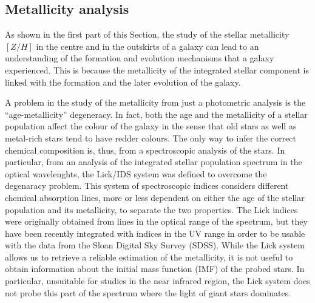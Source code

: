 			
\subsection{Metallicity analysis}	\label{sec:metAn}
	As shown in the first part of this Section, %
	the study of the stellar metallicity $[Z/H]$ in the centre and in the outskirts 
	of a galaxy can lead to an understanding of the formation and evolution mechanisms that a galaxy experienced. 
	This is because the metallicity of the integrated stellar component is linked with the formation and the later 
	evolution of the galaxy.
        
        A problem in the study of the metallicity from just a photometric analysis is the ``age-metallicity'' degeneracy. 
        In fact, both the age and the metallicity of a stellar population affect the colour of the galaxy in the sense that 
        old stars as well as metal-rich stars tend to have redder colours. 
        The only way to infer the correct chemical composition is, thus, from a spectroscopic analysis of the stars.
        In particular, from an analysis of the integrated stellar population spectrum in the optical wavelenghts, the Lick/IDS 
        system \citep{Worthey94} was defined to overcome the degenaracy problem. 
	This system of spectroscopic indices considers different chemical absorption lines, more or less dependent on either the age of the 
	stellar population and its metallicity, to separate the two properties. 
	The Lick indices were originally obtained from lines in the optical range of the spectrum, but they have been 
	recently integrated with indices in the UV range \citet{Franchini10} in order to be usable with the 
	data from the Sloan Digital Sky Survey (SDSS). 
        While the Lick system allows us to retrieve a reliable estimation of the metallicity, it is not useful to obtain 
        information about the initial mass function (IMF) of the probed stars. 
        In particular, unsuitable for studies in the near infrared region, the Lick system does not probe this part 
        of the spectrum where the light of giant stars dominates. 	
	
